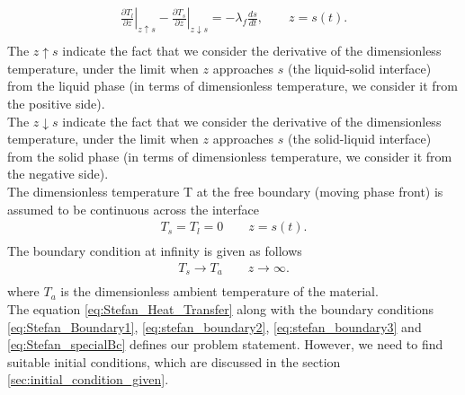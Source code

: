     \begin{subequations}
        \begin{align}
            \left. \frac{\partial T_l}{\partial z} \right|_{z \uparrow s} - \left. \frac{\partial T_s}{\partial z} \right|_{z \downarrow s} = -\lambda_f \frac{ds}{dt}, \qquad z = s(t). \label{eq:Stefan_specialBc}
            \\ \nonumber
        \end{align}
    \end{subequations}
The $z \uparrow s $ indicate the fact that we consider the derivative of the dimensionless temperature, under the limit when $z$ approaches $s$ (the liquid-solid interface) from the liquid phase (in terms of dimensionless temperature, we consider it from the positive side).\\  

The $z \downarrow s $ indicate the fact that we consider the derivative of the dimensionless temperature, under the limit when $z$ approaches $s$ (the solid-liquid interface) from the solid phase (in terms of dimensionless temperature, we consider it from the negative side).\\

The dimensionless temperature T at the free boundary (moving phase front) is assumed to be continuous across the interface\\
\begin{subequations}
        \begin{align}
            T_s = T_l = 0 \qquad z = s(t). \label{eq:stefan_boundary2}
            \\ \nonumber
        \end{align}
    \end{subequations}
The boundary condition at infinity is given as follows\\
\begin{subequations}
        \begin{align}
            T_s \rightarrow T_a \qquad z \rightarrow \infty. \label{eq:stefan_boundary3}
            \\ \nonumber
        \end{align}
    \end{subequations}
where $T_a$ is the dimensionless ambient temperature of the material.\\
The equation \eqref{eq:Stefan_Heat_Transfer} along with the boundary conditions \eqref{eq:Stefan_Boundary1}, \eqref{eq:stefan_boundary2}, \eqref{eq:stefan_boundary3} and \eqref{eq:Stefan_specialBc} defines our problem statement. However, we need to find suitable initial conditions, which are discussed in the section \ref{sec:initial_condition_given}.
